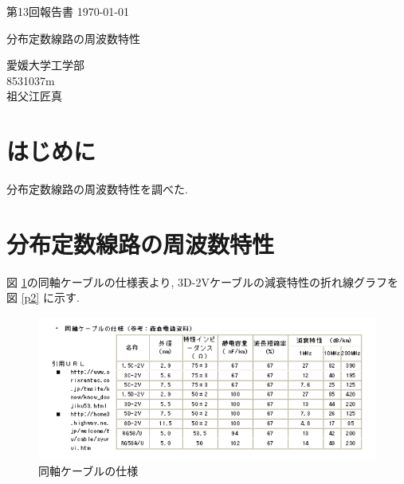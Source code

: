 \documentclass[a4j,12pt,]{jarticle}
\begin{document}
{\noindent\small 第13回報告書 \hfill\today}
\begin{center}
  {\Large 分布定数線路の周波数特性}
\end{center}
\begin{flushright}
  愛媛大学工学部 \\
  8531037m \\
  祖父江匠真 \\
\end{flushright}

\section{はじめに}

分布定数線路の周波数特性を調べた.

\section{分布定数線路の周波数特性}

図 \ref{p1}の同軸ケーブルの仕様表より, 3D-2Vケーブルの減衰特性の折れ線グラフを図 \ref{p2} に示す.

\begin{figure}[H]
  \begin{center}
    \includegraphics[width=160mm]{coaxial_cable_sheet.png}
    \caption{同軸ケーブルの仕様}
    \label{p1}
  \end{center}
\end{figure}
\end{document}
